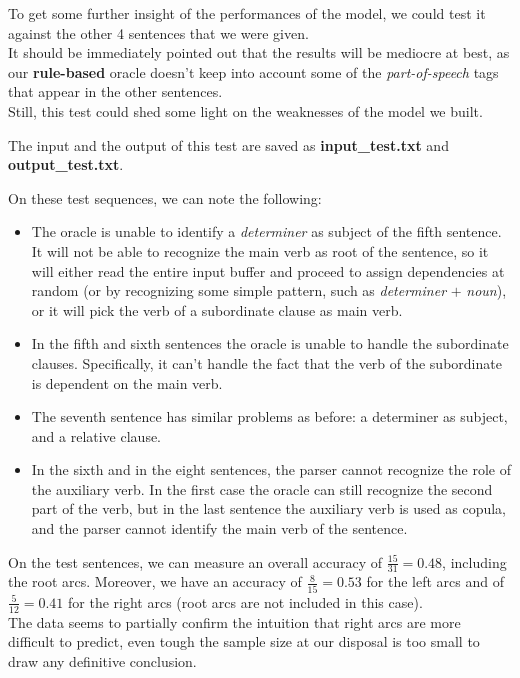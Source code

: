 \documentclass[
12pt,
a4paper,
oneside,
headinclude,
footinclude]{article}
\begin{document}
    To get some further insight of the performances of the model, we could test it against the other 4 sentences that we were given.\\
    It should be immediately pointed out that the results will be mediocre at best, as our \textbf{rule-based} oracle doesn't keep into account some of the \textit{part-of-speech} tags that appear in the other sentences. \\
    Still, this test could shed some light on the weaknesses of the model we built.
    
    The input and the output of this test are saved as \textbf{input\_test.txt} and \textbf{output\_test.txt}.
    
    On these test sequences, we can note the following:
    
    \begin{itemize}
        \item The oracle is unable to identify a \textit{determiner} as subject of the fifth sentence. It will not be able to recognize the main verb as root of the sentence, so it will either read the entire input buffer and proceed to assign dependencies at random (or by recognizing some simple pattern, such as \textit{determiner} $+$ \textit{noun}), or it will pick the verb of a subordinate clause as main verb.
        \item In the fifth and sixth sentences the oracle is unable to handle the subordinate clauses. Specifically, it can't handle the fact that the verb of the subordinate is dependent on the main verb.
        \item The seventh sentence has similar problems as before: a determiner as subject, and a relative clause.
        \item In the sixth and in the eight sentences, the parser cannot recognize the role of the auxiliary verb. In the first case the oracle can still recognize the second part of the verb, but in the last sentence the auxiliary verb is used as copula, and the parser cannot identify the main verb of the sentence.
    \end{itemize}
    
    On the test sentences, we can measure an overall accuracy of $\frac{15}{31} = 0.48$, including the root arcs.
    Moreover, we have an accuracy of $\frac{8}{15} = 0.53$ for the left arcs and of $\frac{5}{12} = 0.41$ for the right arcs (root arcs are not included in this case).\\
    The data seems to partially confirm the intuition that right arcs are more difficult to predict, even tough the sample size at our disposal is too small to draw any definitive conclusion.    
\end{document}
